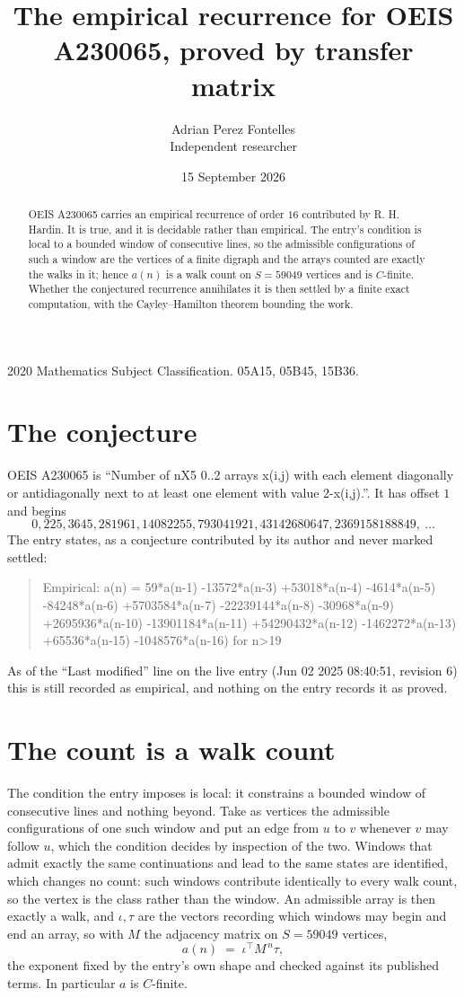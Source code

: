 \documentclass[11pt,a4paper]{article}
\title{The empirical recurrence for OEIS A230065, proved by transfer matrix}
\author{Adrian Perez Fontelles\\ \small Independent researcher}
\date{15 September 2026}
\theoremstyle{plain}
\theoremstyle{definition}
\begin{document}
\maketitle

\begin{abstract}
OEIS A230065 carries an empirical recurrence of order $16$ contributed by R. H. Hardin. It is
true, and it is decidable rather than empirical. The entry's condition is local to a bounded window of consecutive lines, so
the admissible configurations of such a window are the vertices of a finite digraph and the
arrays counted are exactly the walks in it; hence $a(n)$ is a walk count on $S=59049$ vertices
and is $C$-finite. Whether the conjectured recurrence annihilates it is then settled by a
finite exact computation, with the Cayley--Hamilton theorem bounding the work.
\end{abstract}

\noindent\small 2020 Mathematics Subject Classification. 05A15, 05B45, 15B36.\normalsize

\section{The conjecture}

OEIS A230065 is ``Number of nX5 0..2 arrays x(i,j) with each element diagonally or antidiagonally next to at least one element with value 2-x(i,j).''. It has offset $1$ and begins
\[
0, 225, 3645, 281961, 14082255, 793041921, 43142680647, 2369158188849,\ \dots
\]
The entry states, as a conjecture contributed by its author and never marked settled:
\begin{quote}
Empirical: a(n) = 59*a(n-1) -13572*a(n-3) +53018*a(n-4) -4614*a(n-5) -84248*a(n-6) +5703584*a(n-7) -22239144*a(n-8) -30968*a(n-9) +2695936*a(n-10) -13901184*a(n-11) +54290432*a(n-12) -1462272*a(n-13) +65536*a(n-15) -1048576*a(n-16) for n>19
\end{quote}
As of the ``Last modified'' line on the live entry (Jun 02 2025 08:40:51, revision 6) this is still
recorded as empirical, and nothing on the entry records it as proved.

\section{The count is a walk count}

The condition the entry imposes is local: it constrains a bounded window of consecutive lines and nothing beyond. Take as vertices the admissible configurations of one such window and put an edge from $u$ to $v$ whenever $v$ may follow $u$, which the condition decides by inspection of the two. Windows that admit exactly the same continuations and lead to the same states are identified, which changes no count: such windows contribute identically to every walk count, so the vertex is the class rather than the window.
An admissible array is then exactly a walk, and $\iota,\tau$ are the vectors recording which windows may begin and end an array, so with $M$ the adjacency matrix on $S=59049$ vertices,
\[
a(n)\;=\;\iota^{\!\top}M^{\,n}\tau ,
\]
the exponent fixed by the entry's own shape and checked against its published terms. In
particular $a$ is $C$-finite.
\end{document}
